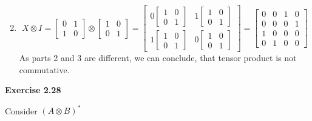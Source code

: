 \documentclass{article}
\begin{document}
\begin{framed}
\begin{enumerate}
$$        $$
        \item 
        $$
        X \otimes I = \begin{bmatrix}0 & 1 \\ 1 & 0\end{bmatrix} \otimes \begin{bmatrix}1 & 0 \\ 0 & 1\end{bmatrix} = \begin{bmatrix}0\begin{bmatrix}1 & 0 \\ 0 & 1\end{bmatrix} & 1\begin{bmatrix}1 & 0 \\ 0 & 1\end{bmatrix} \\ 1\begin{bmatrix}1 & 0 \\ 0 & 1\end{bmatrix} & 0\begin{bmatrix}1 & 0 \\ 0 & 1\end{bmatrix}\end{bmatrix} =\begin{bmatrix} 0 & 0 & 1 & 0\\ 0 & 0 & 0 & 1\\ 1 & 0 & 0 & 0\\ 0 & 1 & 0 & 0\end{bmatrix}
        $$
        As parts 2 and 3 are different, we can conclude, that tensor product is not commutative.
    \end{enumerate}
    
\end{framed}

\bigskip

\begin{framed}
    \noindent \textbf{Exercise 2.28}
    
    \medskip
    Consider $(A \otimes B)^{*}$
    
\end{framed}

\bigskip
\end{document}
